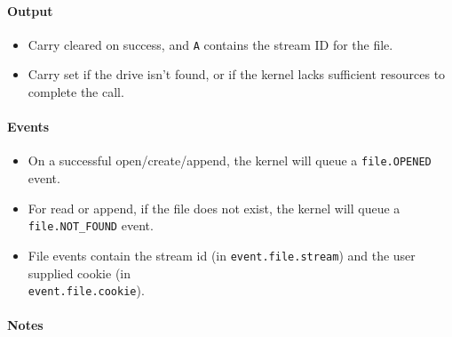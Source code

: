 \paragraph{Output}

\begin{itemize}
\item Carry cleared on success, and \verb+A+ contains the stream ID for the file.
\item Carry set if the drive isn't found, or if the kernel lacks sufficient resources to complete the call.
\end{itemize}

\paragraph{Events}

\begin{itemize}
\item On a successful open/create/append, the kernel will queue a \verb+file.OPENED+ event.
\item For read or append, if the file does not exist, the kernel will queue a \verb+file.NOT_FOUND+ event.
\item File events contain the stream id (in \verb+event.file.stream+) and the user supplied cookie (in\\ \verb+event.file.cookie+).
\end{itemize}

\paragraph{Notes}

